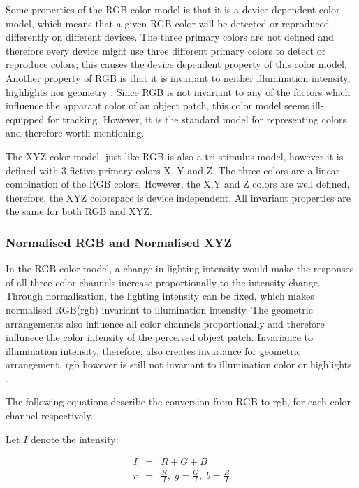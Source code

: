 \documentclass[a4paper,11pt]{article}
\begin{document}
Some properties of the RGB color model is that it is a device dependent color model, which means that a given RGB color will be detected or reproduced differently on different devices. The three primary colors are not defined and therefore every device might use three different primary colors to detect or reproduce colors; this causes the device dependent property of this color model. Another property of RGB is that it is invariant to neither illumination intensity, highlights nor geometry \cite{gevers_invariant}. Since RGB is not invariant to any of the factors which influence the apparant color of an object patch, this color model seems ill-equipped for tracking. However, it is the standard model for representing colors and therefore worth mentioning.



The XYZ color model, just like RGB is also a tri-stimulus model, however it is defined  with 3 fictive primary colors X, Y and Z. The three colors are a linear combination of the RGB colors. However, the X,Y and Z colors are well defined, therefore, the XYZ colorspace is device independent. All invariant properties are the same for both RGB and XYZ.



\subsubsection{Normalised RGB and Normalised XYZ}



In the RGB color model, a change in lighting intensity would make the responses of all three color channels increase proportionally to the intensity change. Through normalisation, the lighting intensity can be fixed, which makes normalised RGB(rgb) invariant to illumination intensity. The geometric arrangements also influence all color channels proportionally and therefore influnece the color intensity of the perceived object patch. Invariance to illumination intensity, therefore, also creates invariance for geometric arrangement. rgb however is still not invariant to illumination color or highlights \cite{gevers_invariant}. 



The following equations describe the conversion from RGB to rgb, for each color channel respectively.  

Let $I$ denote the intensity:

\begin{eqnarray}
\label{eq:rgb}
I &=& R+G+B \\
r &=& \frac{R}{I},\; g = \frac{G}{I},\; b = \frac{B}{I}
\end{eqnarray}
\end{document}
